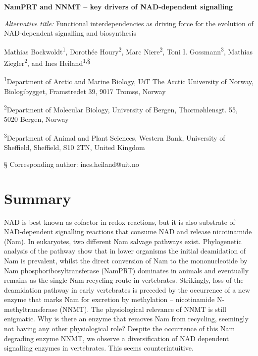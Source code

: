 
\noindent
{\huge\sffamily\bfseries NamPRT and NNMT – key drivers of NAD-dependent signalling \par}

\vspace{15mm}

\noindent
\textit{Alternative title:} Functional interdependencies as driving force for the evolution of NAD-dependent signalling and biosynthesis

\vspace{5mm}

\noindent
Mathias Bockwoldt\textsuperscript{1}, Dorothée Houry\textsuperscript{2}, Marc Niere\textsuperscript{2}, Toni I. Gossmann\textsuperscript{3}, Mathias Ziegler\textsuperscript{2}, and Ines Heiland\textsuperscript{1,§}

\vspace{1cm}

\noindent
\textsuperscript{1}Department of Arctic and Marine Biology, UiT The Arctic University of Norway, Biologibygget, Framstredet 39, 9017 Tromsø, Norway

\noindent
\textsuperscript{2}Department of Molecular Biology, University of Bergen, Thormøhlensgt. 55, 5020 Bergen, Norway

\noindent
\textsuperscript{3}Department of Animal and Plant Sciences, Western Bank, University of Sheffield, Sheffield, S10 2TN, United Kingdom

\noindent
§ Corresponding author: ines.heiland@uit.no


\section*{Summary}

NAD is best known as cofactor in redox reactions, but it is also substrate of NAD-dependent signalling reactions that consume NAD and release nicotinamide (Nam). In eukaryotes, two different Nam salvage pathways exist. Phylogenetic analysis of the pathway show that in lower organisms the initial deamidation of Nam is prevalent, whilst the direct conversion of Nam to the mononucleotide by Nam phosphoribosyltransferase (NamPRT) dominates in animals and eventually remains as the single Nam recycling route in vertebrates. Strikingly, loss of the deamidation pathway in early vertebrates is preceded by the occurrence of a new enzyme that marks Nam for excretion by methylation – nicotinamide N-methyltransferase (NNMT). The physiological relevance of NNMT is still enigmatic. Why is there an enzyme that removes Nam from recycling, seemingly not having any other physiological role? Despite the occurrence of this Nam degrading enzyme NNMT, we observe a diversification of NAD dependent signalling enzymes in vertebrates. This seems counterintuitive.

